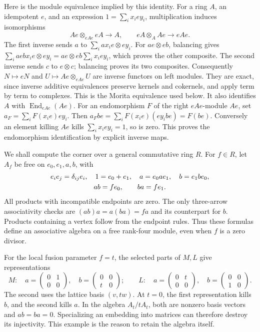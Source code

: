 Here is the module equivalence implied by this identity. For a ring
\(A\), an idempotent \(e\), and an expression
\(1=\sum_i x_i e y_i\), multiplication induces isomorphisms
\[
 Ae\otimes_{eAe}eA\longrightarrow A,\qquad
 eA\otimes_A Ae\longrightarrow eAe.
\]
The first inverse sends \(a\) to \(\sum_i ax_ie\otimes ey_i\).
For \(ae\otimes eb\), balancing gives
\(\sum_i aebx_ie\otimes ey_i=ae\otimes eb\sum_i x_iey_i\),
which proves the other composite. The second inverse sends \(c\) to
\(e\otimes c\); balancing proves its two composites. Consequently
\(N\mapsto eN\) and \(U\mapsto Ae\otimes_{eAe}U\) are inverse
functors on left modules. They are exact, since inverse additive
equivalences preserve kernels and cokernels, and apply term by term to
complexes. This is the Morita equivalence used below.
It also identifies \(A\) with \(\operatorname{End}_{eAe}(Ae)\).
For an endomorphism \(F\) of the right \(eAe\)-module \(Ae\), set
\(a_F=\sum_i F(x_ie)ey_i\). Then
\(a_Fbe=\sum_iF(x_ie)(ey_ibe)=F(be)\).
Conversely an element killing \(Ae\) kills
\(\sum_i x_iey_i=1\), so is zero. This proves the endomorphism
identification by explicit inverse maps.

We shall compute the corner over a general commutative ring \(R\).
For \(f\in R\), let \(A_f\) be free on \(e_0,e_1,a,b\), with
\begin{gather}\label{eq:fc-rankfour}
 e_i e_j=\delta_{ij}e_i,\quad 1=e_0+e_1,\quad
 a=e_0ae_1,\quad b=e_1be_0,\\
 ab=fe_0,\qquad ba=fe_1.\notag
\end{gather}
All products with incompatible endpoints are zero. The only three-arrow
associativity checks are \((ab)a=a(ba)=fa\) and its counterpart for
\(b\). Products containing a vertex follow from the endpoint rules.
Thus these formulas define an associative algebra on a free rank-four
module, even when \(f\) is a zero divisor.

For the local fusion parameter \(f=t\), the selected parts of \(M,L\)
give representations
\begin{equation}\label{eq:fc-probes}
 M:\quad a=\begin{pmatrix}0&1\\0&0\end{pmatrix},\quad
 b=\begin{pmatrix}0&0\\t&0\end{pmatrix};
 \qquad
 L:\quad a=\begin{pmatrix}0&t\\0&0\end{pmatrix},\quad
 b=\begin{pmatrix}0&0\\1&0\end{pmatrix}.
\end{equation}
The second uses the lattice basis \((v,tw)\). At \(t=0\), the first
representation kills \(b\), and the second kills \(a\). In the algebra
\(A_t/tA_t\), both are nonzero basis vectors and \(ab=ba=0\).
Specializing an embedding into matrices can therefore destroy its
injectivity. This example is the reason to retain the algebra itself.

